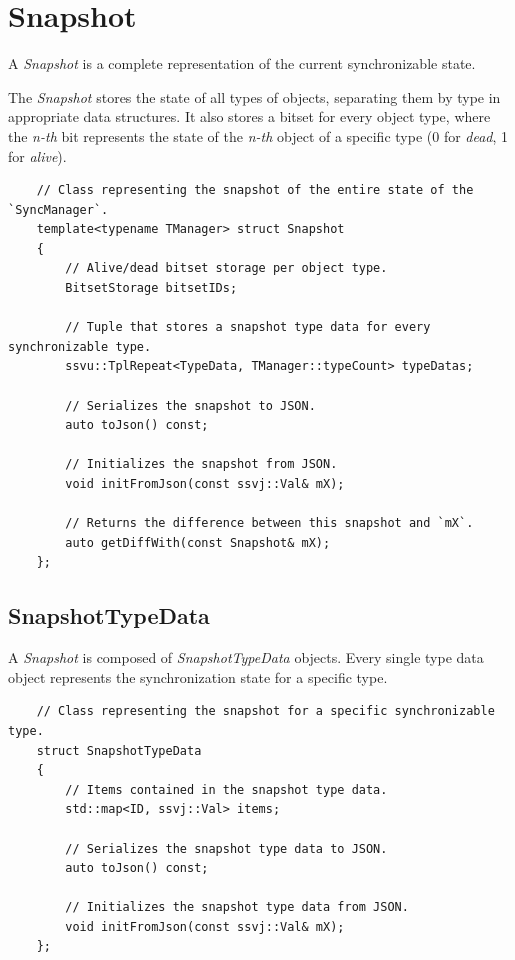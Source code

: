 \documentclass{report}
\def \cppStart {\begin{verbatim}}
\begin{document}
        \section{Snapshot}

            A \emph{Snapshot} is a complete representation of the current synchronizable state.

            The \emph{Snapshot} stores the state of all types of objects, separating them by type in appropriate data structures.
            It also stores a bitset for every object type, where the \emph{n-th} bit represents the state of the \emph{n-th} object of a specific type (0 for \emph{dead}, 1 for \emph{alive}).

\cppStart
    // Class representing the snapshot of the entire state of the `SyncManager`.
    template<typename TManager> struct Snapshot
    {
        // Alive/dead bitset storage per object type.
        BitsetStorage bitsetIDs;

        // Tuple that stores a snapshot type data for every synchronizable type.
        ssvu::TplRepeat<TypeData, TManager::typeCount> typeDatas;

        // Serializes the snapshot to JSON.
        auto toJson() const;

        // Initializes the snapshot from JSON.
        void initFromJson(const ssvj::Val& mX);

        // Returns the difference between this snapshot and `mX`.
        auto getDiffWith(const Snapshot& mX);
    };
\end{verbatim}

            \subsection{SnapshotTypeData}

                A \emph{Snapshot} is composed of \emph{SnapshotTypeData} objects. 
                Every single type data object represents the synchronization state for a specific type.

\cppStart
    // Class representing the snapshot for a specific synchronizable type.
    struct SnapshotTypeData
    {
        // Items contained in the snapshot type data.
        std::map<ID, ssvj::Val> items;

        // Serializes the snapshot type data to JSON.
        auto toJson() const;

        // Initializes the snapshot type data from JSON.
        void initFromJson(const ssvj::Val& mX);
    };
\end{verbatim}
    
\end{document}
